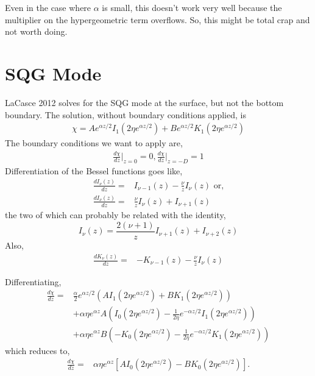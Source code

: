 \documentclass[11pt]{article}
\begin{document}
Even in the case where $\alpha$ is small, this doesn't work very well because the multiplier on the hypergeometric term overflows. So, this might be total crap and not worth doing.

%
\section{SQG Mode}
%

LaCasce 2012 solves for the SQG mode at the surface, but not the bottom boundary. The solution, without boundary conditions applied, is
\begin{align}
\chi = A e^{\alpha z/2} I_1 \left( 2 \eta e^{\alpha z/2} \right) + B e^{\alpha z/2} K_1 \left( 2 \eta e^{\alpha z/2} \right)
\end{align}
The boundary conditions we want to apply are,
\begin{align}
\frac{d\chi}{dz} \biggr\rvert_{z=0} = 0, \frac{d\chi}{dz} \biggr\rvert_{z=-D} = 1
\end{align}
Differentiation of the Bessel functions goes like,
\begin{align}
\frac{ d I_\nu(z)}{d z} =& I_{\nu-1}(z) - \frac{\nu}{z} I_\nu(z) \textrm{ or,}\\
\frac{ d I_\nu(z)}{d z} =& \frac{\nu}{z} I_{\nu}(z) + I_{\nu+1} (z) 
\end{align}
the two of which can probably be related with the identity,
\begin{equation}
I_\nu(z) = \frac{2(\nu+1)}{z} I_{\nu+1}(z) + I_{\nu+2}(z)
\end{equation}
Also,
\begin{align}
\frac{ d K_\nu(z)}{d z} =& -K_{\nu-1}(z) - \frac{\nu}{z} I_\nu(z)
\end{align}

Differentiating,
\begin{align}
\frac{d\chi}{dz}=& \frac{\alpha}{2} e^{\alpha z/2} \left( A I_1 \left( 2 \eta e^{\alpha z/2} \right) + B K_1 \left( 2 \eta e^{\alpha z/2} \right) \right) \\
&+  \alpha \eta e^{\alpha z}  A \left(  I_0 \left( 2 \eta e^{\alpha z/2} \right) - \frac{1}{2 \eta } e^{-\alpha z/2} I_1 \left( 2 \eta e^{\alpha z/2} \right) \right) \\
&+  \alpha \eta e^{\alpha z}  B\left(  - K_0 \left( 2 \eta e^{\alpha z/2} \right) -  \frac{1}{2 \eta } e^{-\alpha z/2} K_1 \left( 2 \eta e^{\alpha z/2} \right) \right) 
\end{align}
which reduces to,
\begin{align}
\frac{d\chi}{dz}=& \alpha   \eta e^{\alpha z} \left[ A I_0 \left( 2 \eta e^{\alpha z/2} \right) - B K_0 \left( 2 \eta e^{\alpha z/2} \right)  \right].
\end{align}
\end{document}
